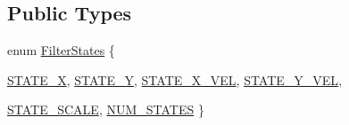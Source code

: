 \subsection*{Public Types}
\begin{DoxyCompactItemize}
\item 
enum \hyperlink{classParticleFilter_a5fd916dcc074edfb45cf0f90e6e7816a}{FilterStates} \{ \par
\hyperlink{classParticleFilter_a5fd916dcc074edfb45cf0f90e6e7816aa592f65912830c1757e3dd87aaf094ded}{STATE\_\-X}, 
\hyperlink{classParticleFilter_a5fd916dcc074edfb45cf0f90e6e7816aaaccdf213f2315178644fa199657af377}{STATE\_\-Y}, 
\hyperlink{classParticleFilter_a5fd916dcc074edfb45cf0f90e6e7816aa8f405cfb59cb161e13f67ac80f048d64}{STATE\_\-X\_\-VEL}, 
\hyperlink{classParticleFilter_a5fd916dcc074edfb45cf0f90e6e7816aaa5c18829321e55f7f3ccbe9521160d43}{STATE\_\-Y\_\-VEL}, 
\par
\hyperlink{classParticleFilter_a5fd916dcc074edfb45cf0f90e6e7816aac85f631868fa888a31c4b1048f26c9b9}{STATE\_\-SCALE}, 
\hyperlink{classParticleFilter_a5fd916dcc074edfb45cf0f90e6e7816aa6be500dda12c848a8fa746cecf967e59}{NUM\_\-STATES}
 \}
\end{DoxyCompactItemize}
